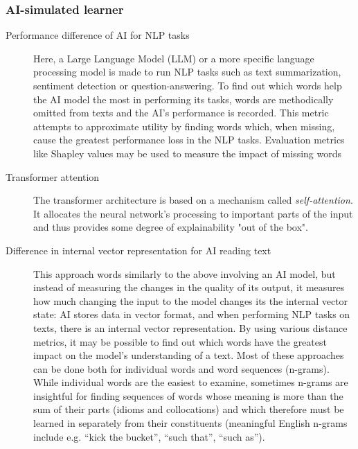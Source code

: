 \subsubsection{AI-simulated learner}
\begin{description}
	\item [Performance difference of AI for NLP tasks]
	      Here, a Large Language Model (LLM) or a more specific language processing model is made to run NLP tasks such as text summarization, sentiment detection or question-answering.
	      To find out which words help the AI model the most in performing its tasks, words are methodically omitted from texts and the AI’s performance is recorded.
	      This metric attempts to approximate utility by finding words which, when missing, cause the greatest performance loss in the NLP tasks.
		  Evaluation metrics like Shapley values \cite{wangShapleyExplanationNetworks2021} may be used to measure the impact of missing words
	\item [Transformer attention]
		The transformer architecture is based on a mechanism called \textit{self-attention}.
		It allocates the neural network's processing to important parts of the input and thus provides some degree of explainability "out of the box".

	\item [Difference in internal vector representation for AI reading text]
	      This approach words similarly to the above involving an AI model, but instead of measuring the changes in the quality of its output, it measures how much changing the input to the model changes its the internal vector state: AI stores data in vector format, and when performing NLP tasks on texts, there is an internal vector representation.
	      By using various distance metrics, it may be possible to find out which words have the greatest impact on the model’s understanding of a text.
	      Most of these approaches can be done both for individual words and word sequences (n-grams).
	      While individual words are the easiest to examine, sometimes n-grams are insightful for finding sequences of words whose meaning is more than the sum of their parts (idioms and collocations) and which therefore must be learned in separately from their constituents (meaningful English n-grams include e.g. “kick the bucket”, “such that”, “such as”).


\end{description}
